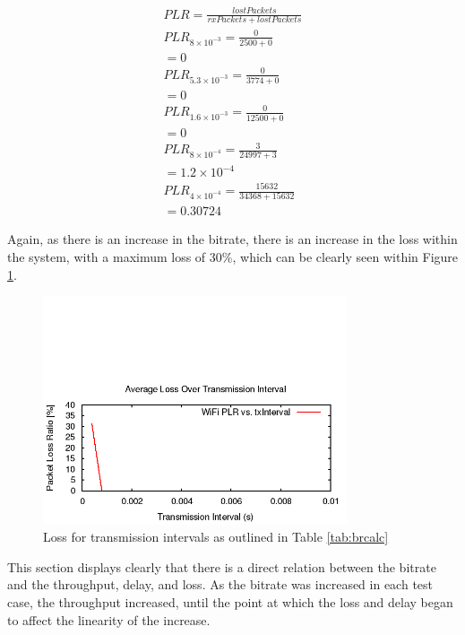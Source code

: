 \begin{gather*}
	PLR=\frac{lostPackets}{rxPackets+lostPackets} \\
	PLR_{8\times10^{-3}}=\frac{0}{2500+0} \\
	= 0 \\
	PLR_{5.3\times10^{-3}}=\frac{0}{3774+0} \\
	= 0 \\
	PLR_{1.6\times10^{-3}}=\frac{0}{12500+0} \\
	= 0 \\
	PLR_{8\times10^{-4}}=\frac{3}{24997+3} \\
	= 1.2\times10^{-4} \\
	PLR_{4\times10^{-4}}=\frac{15632}{34368+15632} \\
	= 0.30724
\end{gather*}

Again, as there is an increase in the bitrate, there is an increase in the loss
within the system, with a maximum loss of 30\%, which can be clearly seen within
Figure \ref{fig:QAP2Loss}.

\begin{figure}[H]
	\centering
	\includegraphics[width=0.8\textwidth]{images/EE500/QA/P2/Images/wifi-loss}
	\caption{Loss for transmission intervals as outlined in Table
	\ref{tab:brcalc}}
	\label{fig:QAP2Loss}
\end{figure}

This section displays clearly that there is a direct relation between the
bitrate and the throughput, delay, and loss. As the bitrate was increased in
each test case, the throughput increased, until the point at which the loss and
delay began to affect the linearity of the increase.
